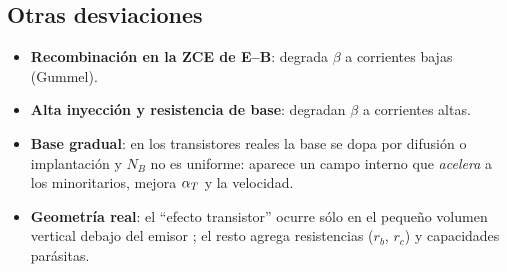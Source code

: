 \subsection{Otras desviaciones}

\begin{itemize}
  \item \textbf{Recombinación en la ZCE de E--B}: degrada $\beta$ a corrientes bajas (Gummel).
  \item \textbf{Alta inyección y resistencia de base}: degradan $\beta$ a corrientes altas.
  \item \textbf{Base gradual}: en los transistores reales la base se dopa por difusión o
  implantación y $N_B$ no es uniforme: aparece un campo interno que \emph{acelera} a los
  minoritarios, mejora $\alpha_T$ y la velocidad.
  \item \textbf{Geometría real}: el ``efecto transistor'' ocurre sólo en el pequeño volumen
  vertical debajo del emisor ; el resto agrega resistencias ($r_b$, $r_c$) y
  capacidades parásitas.
\end{itemize}
